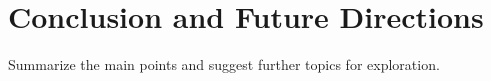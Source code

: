 \section{Conclusion and Future Directions}
Summarize the main points and suggest further topics for exploration.